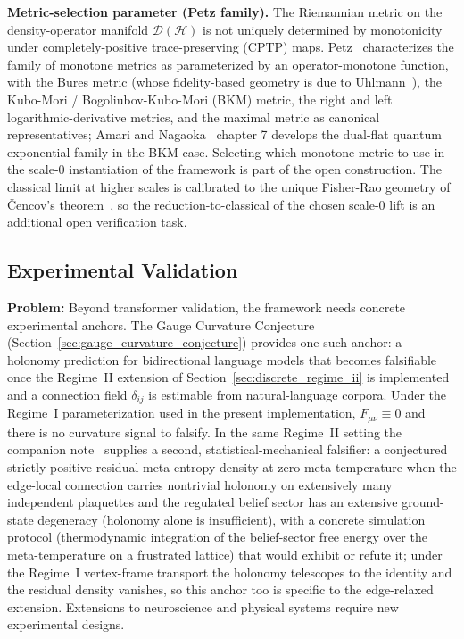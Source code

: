 \documentclass[11pt]{article}
\begin{document}
\textbf{Metric-selection parameter (Petz family).} The Riemannian metric on the density-operator manifold $\mathcal{D}(\mathcal{H})$ is not uniquely determined by monotonicity under completely-positive trace-preserving (CPTP) maps. Petz~\cite{Petz1996} characterizes the family of monotone metrics as parameterized by an operator-monotone function, with the Bures metric (whose fidelity-based geometry is due to Uhlmann~\cite{Uhlmann1976}), the Kubo-Mori / Bogoliubov-Kubo-Mori (BKM) metric, the right and left logarithmic-derivative metrics, and the maximal metric as canonical representatives; Amari and Nagaoka~\cite{AmariNagaoka2000} chapter 7 develops the dual-flat quantum exponential family in the BKM case. Selecting which monotone metric to use in the scale-0 instantiation of the framework is part of the open construction. The classical limit at higher scales is calibrated to the unique Fisher-Rao geometry of \v{C}encov's theorem~\cite{Cencov1982}, so the reduction-to-classical of the chosen scale-0 lift is an additional open verification task.

\subsection{Experimental Validation}

\textbf{Problem:} Beyond transformer validation, the framework needs concrete experimental anchors. The Gauge Curvature Conjecture (Section~\ref{sec:gauge_curvature_conjecture}) provides one such anchor: a holonomy prediction for bidirectional language models that becomes falsifiable once the Regime~II extension of Section~\ref{sec:discrete_regime_ii} is implemented and a connection field $\delta_{ij}$ is estimable from natural-language corpora. Under the Regime~I parameterization used in the present implementation, $F_{\mu\nu} \equiv 0$ and there is no curvature signal to falsify. In the same Regime~II setting the companion note~\cite{Dennis2026metaentropy} supplies a second, statistical-mechanical falsifier: a conjectured strictly positive residual meta-entropy density at zero meta-temperature when the edge-local connection carries nontrivial holonomy on extensively many independent plaquettes and the regulated belief sector has an extensive ground-state degeneracy (holonomy alone is insufficient), with a concrete simulation protocol (thermodynamic integration of the belief-sector free energy over the meta-temperature on a frustrated lattice) that would exhibit or refute it; under the Regime~I vertex-frame transport the holonomy telescopes to the identity and the residual density vanishes, so this anchor too is specific to the edge-relaxed extension. Extensions to neuroscience and physical systems require new experimental designs.
\end{document}
